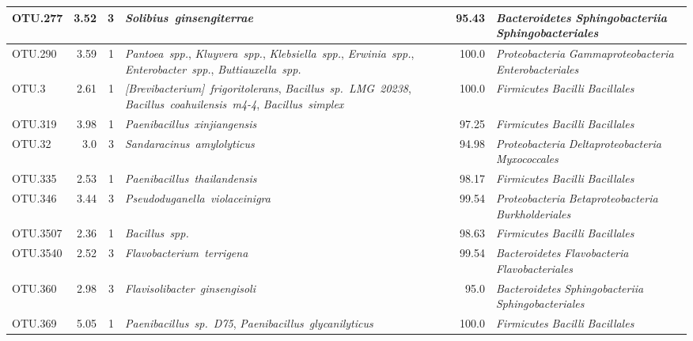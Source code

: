 \begin{ThreePartTable}
\begin{longtable}{lrrP{5cm}rP{5cm}}
OTU.277 & 3.52 & 3 & \mbox{\textit{Solibius ginsengiterrae}} & 95.43 & \mbox{\textit{Bacteroidetes}} \mbox{\textit{Sphingobacteriia}} \mbox{\textit{Sphingobacteriales}} \\ \midrule
OTU.290 & 3.59 & 1 & \mbox{\textit{Pantoea spp.}}, \mbox{\textit{Kluyvera spp.}}, \mbox{\textit{Klebsiella spp.}}, \mbox{\textit{Erwinia spp.}}, \mbox{\textit{Enterobacter spp.}}, \mbox{\textit{Buttiauxella spp.}} & 100.0 & \mbox{\textit{Proteobacteria}} \mbox{\textit{Gammaproteobacteria}} \mbox{\textit{Enterobacteriales}} \\ \midrule
OTU.3 & 2.61 & 1 & \mbox{\textit{[Brevibacterium] frigoritolerans}}, \mbox{\textit{Bacillus sp. LMG 20238}}, \mbox{\textit{Bacillus coahuilensis m4-4}}, \mbox{\textit{Bacillus simplex}} & 100.0 & \mbox{\textit{Firmicutes}} \mbox{\textit{Bacilli}} \mbox{\textit{Bacillales}} \\ \midrule
OTU.319 & 3.98 & 1 & \mbox{\textit{Paenibacillus xinjiangensis}} & 97.25 & \mbox{\textit{Firmicutes}} \mbox{\textit{Bacilli}} \mbox{\textit{Bacillales}} \\ \midrule
OTU.32 & 3.0 & 3 & \mbox{\textit{Sandaracinus amylolyticus}} & 94.98 & \mbox{\textit{Proteobacteria}} \mbox{\textit{Deltaproteobacteria}} \mbox{\textit{Myxococcales}} \\ \midrule
OTU.335 & 2.53 & 1 & \mbox{\textit{Paenibacillus thailandensis}} & 98.17 & \mbox{\textit{Firmicutes}} \mbox{\textit{Bacilli}} \mbox{\textit{Bacillales}} \\ \midrule
OTU.346 & 3.44 & 3 & \mbox{\textit{Pseudoduganella violaceinigra}} & 99.54 & \mbox{\textit{Proteobacteria}} \mbox{\textit{Betaproteobacteria}} \mbox{\textit{Burkholderiales}} \\ \midrule
OTU.3507 & 2.36 & 1 & \mbox{\textit{Bacillus spp.}} & 98.63 & \mbox{\textit{Firmicutes}} \mbox{\textit{Bacilli}} \mbox{\textit{Bacillales}} \\ \midrule
OTU.3540 & 2.52 & 3 & \mbox{\textit{Flavobacterium terrigena}} & 99.54 & \mbox{\textit{Bacteroidetes}} \mbox{\textit{Flavobacteria}} \mbox{\textit{Flavobacteriales}} \\ \midrule
OTU.360 & 2.98 & 3 & \mbox{\textit{Flavisolibacter ginsengisoli}} & 95.0 & \mbox{\textit{Bacteroidetes}} \mbox{\textit{Sphingobacteriia}} \mbox{\textit{Sphingobacteriales}} \\ \midrule
OTU.369 & 5.05 & 1 & \mbox{\textit{Paenibacillus sp. D75}}, \mbox{\textit{Paenibacillus glycanilyticus}} & 100.0 & \mbox{\textit{Firmicutes}} \mbox{\textit{Bacilli}} \mbox{\textit{Bacillales}} \\ \midrule

\end{longtable}
\end{ThreePartTable}

